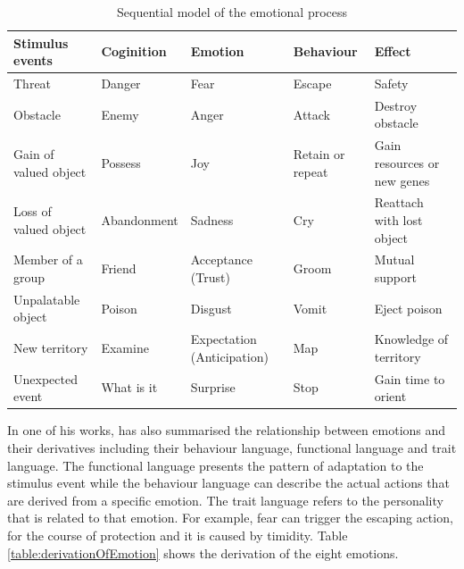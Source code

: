 \begin{table}
\caption{Sequential model of the emotional process}
\label{table:sequentialModelOfEmotion}
\begin{tabular}{|p{2.5cm}|p{2.5cm}|p{2cm}|p{2cm}|p{4.5cm}|}
\hline
\textbf{Stimulus events} & \textbf{Coginition} & \textbf{Emotion} & \textbf{Behaviour} & \textbf{Effect} \\
\hline
Threat & Danger & Fear & Escape & Safety \\
\hline
Obstacle & Enemy & Anger & Attack & Destroy obstacle \\
\hline
Gain of valued object & Possess & Joy & Retain or repeat & Gain resources or new genes \\
\hline
Loss of valued object & Abandonment & Sadness & Cry & Reattach with lost object \\
\hline
Member of a group & Friend & Acceptance (Trust) & Groom & Mutual support \\
\hline
Unpalatable object & Poison & Disgust & Vomit & Eject poison \\
\hline
New territory & Examine & Expectation (Anticipation) & Map & Knowledge of territory \\
\hline
Unexpected event & What is it & Surprise & Stop & Gain time to orient \\
\hline
\end{tabular}
\end{table}

In one of his works, \citet{plutchik2001integration} has also summarised the relationship between emotions and their derivatives including their behaviour language, functional language and trait language. The functional language presents the pattern of adaptation to the stimulus event while the behaviour language can describe the actual actions that are derived from a specific emotion. The trait language refers to the personality that is related to that emotion. For example, fear can trigger the escaping action, for the course of protection and it is caused by timidity. Table \ref{table:derivationOfEmotion} shows the derivation of the eight emotions.

